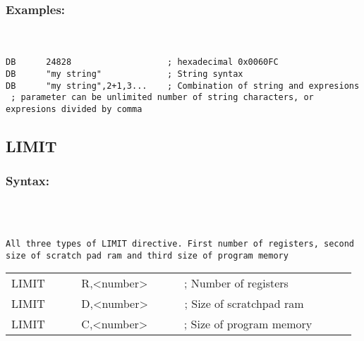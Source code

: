 {        \subsubsection{Examples:}\\
        {
            ~\\
            \usecodefont
            \verb'DB      24828                   ; hexadecimal 0x0060FC'\\
            \verb'DB      "my string"             ; String syntax'\\
            \verb'DB      "my string",2+1,3...    ; Combination of string and expresions'\\
            \verb' ; parameter can be unlimited number of string characters, or expresions divided by comma'\\
        }
    \subsection{LIMIT}
        \subsubsection{Syntax:}\\
        \\ {
                \texttt{All three types of LIMIT directive. First number of registers, second size of scratch pad ram and third size of program memory}
                \begin{tabular}[h!]{llll}
                        { \color{highlight_directive} LIMIT }   \verb`     `
                        { \color{highlight_symbol} R,<number> }  \verb`     `   { \color{highlight_comment} ; Number of registers }\\
                        { \color{highlight_directive} LIMIT }   \verb`     `
                        { \color{highlight_symbol} D,<number> }  \verb`     `   { \color{highlight_comment} ; Size of scratchpad ram }\\
                        { \color{highlight_directive} LIMIT }  \verb`     `
                        { \color{highlight_symbol} C,<number> }  \verb`     `   { \color{highlight_comment} ; Size of program memory }
                \end{tabular}
            }\\
            \\
}
